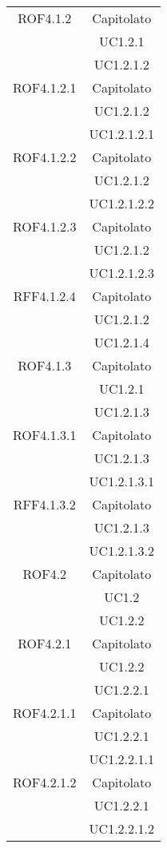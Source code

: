 \begin{longtable}{|c|c|}
\midrule
ROF4.1.2
& Capitolato\\
& UC1.2.1\\
& UC1.2.1.2\\

\midrule
ROF4.1.2.1
& Capitolato\\
& UC1.2.1.2\\
& UC1.2.1.2.1\\

\midrule
ROF4.1.2.2
& Capitolato\\
& UC1.2.1.2\\
& UC1.2.1.2.2\\

\midrule
ROF4.1.2.3
& Capitolato\\
& UC1.2.1.2\\
& UC1.2.1.2.3\\

\midrule
RFF4.1.2.4
& Capitolato\\
& UC1.2.1.2\\
& UC1.2.1.4\\

\midrule
ROF4.1.3
& Capitolato\\
& UC1.2.1\\
& UC1.2.1.3\\

\midrule
ROF4.1.3.1
& Capitolato\\
& UC1.2.1.3\\
& UC1.2.1.3.1\\

\midrule
RFF4.1.3.2
& Capitolato\\
& UC1.2.1.3\\
& UC1.2.1.3.2\\

\midrule
ROF4.2
& Capitolato\\
& UC1.2\\
& UC1.2.2\\

\midrule
ROF4.2.1
& Capitolato\\
& UC1.2.2\\
& UC1.2.2.1\\

\midrule
ROF4.2.1.1
& Capitolato\\
& UC1.2.2.1\\
& UC1.2.2.1.1\\

\midrule
ROF4.2.1.2
& Capitolato\\
& UC1.2.2.1\\
& UC1.2.2.1.2\\


\end{longtable}
